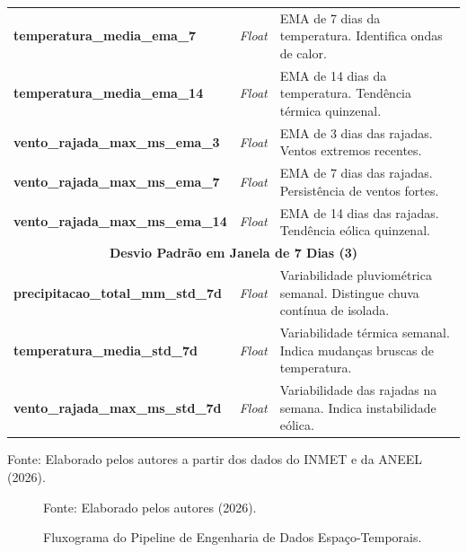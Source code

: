 \begin{center}
\begin{longtable}{p{6cm} p{1.2cm} p{5.8cm}}
\textbf{temperatura\_media\_ema\_7} & \textit{Float} & EMA de 7 dias da temperatura. Identifica ondas de calor. \\
\textbf{temperatura\_media\_ema\_14} & \textit{Float} & EMA de 14 dias da temperatura. Tendência térmica quinzenal. \\
\textbf{vento\_rajada\_max\_ms\_ema\_3} & \textit{Float} & EMA de 3 dias das rajadas. Ventos extremos recentes. \\
\textbf{vento\_rajada\_max\_ms\_ema\_7} & \textit{Float} & EMA de 7 dias das rajadas. Persistência de ventos fortes. \\
\textbf{vento\_rajada\_max\_ms\_ema\_14} & \textit{Float} & EMA de 14 dias das rajadas. Tendência eólica quinzenal. \\
\midrule
\multicolumn{3}{c}{\textbf{Desvio Padrão em Janela de 7 Dias (3)}} \\
\midrule
\textbf{precipitacao\_total\_mm\_std\_7d} & \textit{Float} & Variabilidade pluviométrica semanal. Distingue chuva contínua de isolada. \\
\textbf{temperatura\_media\_std\_7d} & \textit{Float} & Variabilidade térmica semanal. Indica mudanças bruscas de temperatura. \\
\textbf{vento\_rajada\_max\_ms\_std\_7d} & \textit{Float} & Variabilidade das rajadas na semana. Indica instabilidade eólica. \\
\end{longtable}
\endgroup
\small{Fonte: Elaborado pelos autores a partir dos dados do INMET e da ANEEL (2026).}
\normalsize
\end{center}

\begin{figure}[H]
\centering
{}
\caption{Fluxograma do Pipeline de Engenharia de Dados Espaço-Temporais.}
\small{Fonte: Elaborado pelos autores (2026).}
\label{fig:fluxograma_dados}
\end{figure}

